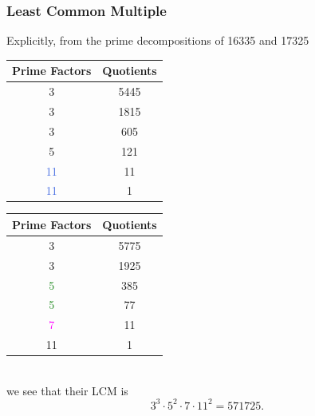 \documentclass[aspectratio=169,11pt,usenames,dvipsnames]{beamer}
\newcommand{\clr}{\textcolor{BrickRed}}
\newcommand{\clb}{\textcolor{RoyalBlue}}
\newcommand{\clg}{\textcolor{ForestGreen}}
\newcommand{\clm}{\textcolor{Magenta}}
\begin{document}
\begin{frame}
 \frametitle{Least Common Multiple}
 Explicitly, from the prime decompositions of 16335 and 17325\\
 \vspace{1em}
 \begin{minipage}{.48\textwidth}
  \centering
   \begin{tabular}{c|c}
    \textbf{Prime Factors} & \textbf{Quotients}\\
    \toprule
    \clr{3} & 5445\\
    \clr{3} & 1815\\
    \clr{3} & 605\\
    5 & 121\\
    \clb{11} & 11\\
    \clb{11} & 1
  \end{tabular}
 \end{minipage}
 \begin{minipage}{.48\textwidth}
   \begin{tabular}{c|c}
    \textbf{Prime Factors} & \textbf{Quotients}\\
    \toprule
    3 & 5775\\
    3 & 1925\\
    \clg{5} & 385\\
    \clg{5} & 77\\
    \clm{7} & 11\\
    11 & 1
  \end{tabular}
 \end{minipage}\\
 \pause
 \vspace{1em}
 we see that their LCM is
 \[
  3^3 \cdot 5^2 \cdot 7 \cdot 11^2 = 571725.
 \]
\end{frame}
\end{document}
